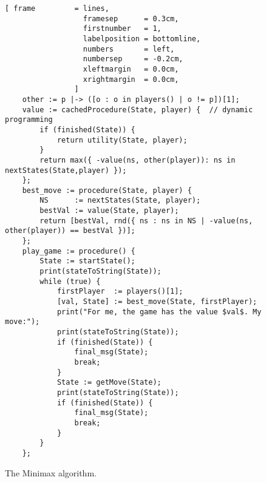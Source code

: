 \begin{figure}[!ht]
\centering
\begin{Verbatim}[ frame         = lines, 
                  framesep      = 0.3cm, 
                  firstnumber   = 1,
                  labelposition = bottomline,
                  numbers       = left,
                  numbersep     = -0.2cm,
                  xleftmargin   = 0.0cm,
                  xrightmargin  = 0.0cm,
                ]
    other := p |-> ([o : o in players() | o != p])[1];
    value := cachedProcedure(State, player) {  // dynamic programming
        if (finished(State)) {
            return utility(State, player);
        }
        return max({ -value(ns, other(player)): ns in nextStates(State,player) });
    };
    best_move := procedure(State, player) {
        NS      := nextStates(State, player);
        bestVal := value(State, player);
        return [bestVal, rnd({ ns : ns in NS | -value(ns, other(player)) == bestVal })];
    };
    play_game := procedure() {
        State := startState();
        print(stateToString(State));
        while (true) {
            firstPlayer  := players()[1];
            [val, State] := best_move(State, firstPlayer);
            print("For me, the game has the value $val$. My move:");
            print(stateToString(State));
            if (finished(State)) { 
                final_msg(State); 
                break;
            }
            State := getMove(State);
            print(stateToString(State));
            if (finished(State)) { 
                final_msg(State);
                break;
            }
        }
    };
\end{Verbatim}
\vspace*{-0.3cm}
\caption{The Minimax algorithm.}
\label{fig:game.stlx}
\end{figure}
